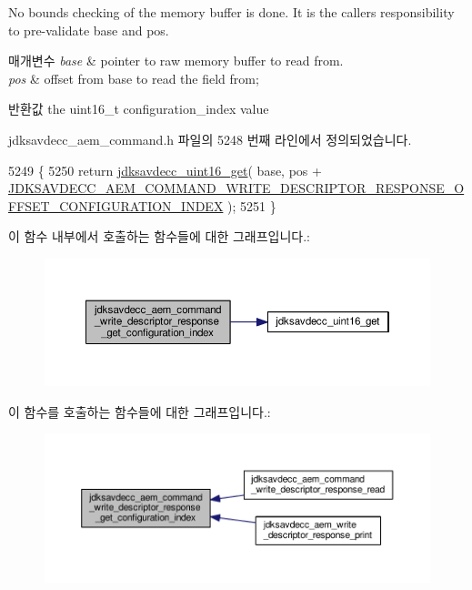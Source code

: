 No bounds checking of the memory buffer is done. It is the caller\textquotesingle{}s responsibility to pre-\/validate base and pos.


\begin{DoxyParams}{매개변수}
{\em base} & pointer to raw memory buffer to read from. \\
\hline
{\em pos} & offset from base to read the field from; \\
\hline
\end{DoxyParams}
\begin{DoxyReturn}{반환값}
the uint16\+\_\+t configuration\+\_\+index value 
\end{DoxyReturn}


jdksavdecc\+\_\+aem\+\_\+command.\+h 파일의 5248 번째 라인에서 정의되었습니다.


\begin{DoxyCode}
5249 \{
5250     \textcolor{keywordflow}{return} \hyperlink{group__endian_ga3fbbbc20be954aa61e039872965b0dc9}{jdksavdecc\_uint16\_get}( base, pos + 
      \hyperlink{group__command__write__descriptor__response_ga80fc7b65d2f62340e64a385ac29b6fff}{JDKSAVDECC\_AEM\_COMMAND\_WRITE\_DESCRIPTOR\_RESPONSE\_OFFSET\_CONFIGURATION\_INDEX}
       );
5251 \}
\end{DoxyCode}


이 함수 내부에서 호출하는 함수들에 대한 그래프입니다.\+:
\nopagebreak
\begin{figure}[H]
\begin{center}
\leavevmode
\includegraphics[width=350pt]{group__command__write__descriptor__response_ga78644abd94bda0bc1a353549ca2501b6_cgraph}
\end{center}
\end{figure}




이 함수를 호출하는 함수들에 대한 그래프입니다.\+:
\nopagebreak
\begin{figure}[H]
\begin{center}
\leavevmode
\includegraphics[width=350pt]{group__command__write__descriptor__response_ga78644abd94bda0bc1a353549ca2501b6_icgraph}
\end{center}
\end{figure}



